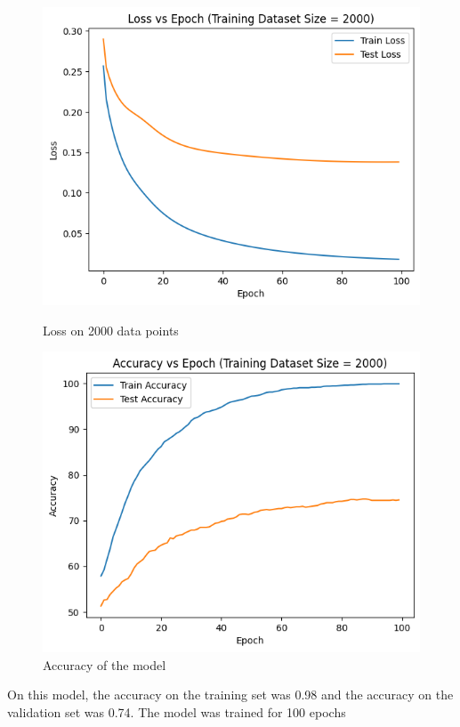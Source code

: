 \documentclass{article}
\begin{document}
\begin{figure}[h!]
    \centering
    \begin{minipage}{0.45\textwidth}
        \centering
        \includegraphics[width=1\textwidth]{output2000.png} %
        \caption{Loss on 2000 data points}
    \end{minipage}\hfill
    \begin{minipage}{0.45\textwidth}
        \centering
        \includegraphics[width=1\textwidth]{acc2000.png} %
        \caption{Accuracy of the model}
    \end{minipage}
\end{figure}
\newline On this model, the accuracy on the training set was 0.98 and the accuracy on the validation set was 0.74. The model was trained for 100 epochs
\end{document}
